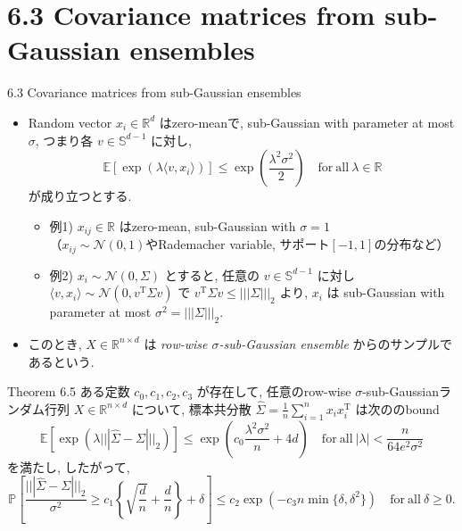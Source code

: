 \documentclass[unicode,aspectratio=169,11pt]{beamer}
\newcommand{\ex}{\mathbb{E}}
\newcommand{\bb}{\mathbb}
\newcommand{\cc}{\mathcal}
\newcommand{\tr}{\mathrm{T}}
\begin{document}
\section{6.3 Covariance matrices from sub-Gaussian ensembles}
\begin{frame}{6.3 Covariance matrices from sub-Gaussian ensembles}{}
  \begin{itemize}
    \item Random vector $x_i \in \bb{R}^d$ はzero-meanで, sub-Gaussian with parameter at most $\sigma$, つまり各 $v \in \bb{S}^{d-1}$ に対し,
          \[
              \ex\left[\exp\left(\lambda \langle v, x_i \rangle\right)\right]
              \le \exp\left(\frac{\lambda^2\sigma^2}{2}\right)
              \quad \mathrm{for\ all}\ \lambda \in \bb{R}
              \tag{6.18}
          \]
          が成り立つとする.
          \begin{itemize}
            \item 例1) $x_{ij} \in \bb{R}$ はzero-mean, sub-Gaussian with $\sigma = 1$\\
                  （$x_{ij} \sim \cc{N}(0,1)$やRademacher variable, サポート$[-1,1]$の分布など）
            \item 例2) $x_i \sim \cc{N}(0, \Sigma)$ とすると,
            任意の $v \in \bb{S}^{d-1}$ に対し $\langle v, x_i \rangle \sim \cc{N}(0, v^\tr \Sigma v)$ で $v^\tr \Sigma v \le |||\Sigma|||_2$ より,
            $x_i$ は sub-Gaussian with parameter at most $\sigma^2 = |||\Sigma|||_2$.
          \end{itemize}
    \item このとき, $X \in \bb{R}^{n \times d}$ は {\it row-wise $\sigma$-sub-Gaussian ensemble} からのサンプルであるという.
  \end{itemize}
\end{frame}

\begin{frame}
  \begin{block}{Theorem 6.5}
    ある定数 $c_0, c_1, c_2 , c_3$ が存在して,
    任意のrow-wise $\sigma$-sub-Gaussianランダム行列 $X \in \bb{R}^{n \times d}$ について,
    標本共分散 $\widehat{\Sigma} = \frac{1}{n}\sum_{i=1}^n x_i x_i^\tr$ は次ののbound
    \[
      \ex\left[ \exp\left( \lambda |||\widehat{\Sigma} - \Sigma|||_2 \right) \right]
      \le \exp\left( c_0\frac{\lambda^2\sigma^2}{n} + 4d \right)
      \quad \mathrm{for\ all}\ |\lambda| < \frac{n}{64e^2\sigma^2}
      \tag{6.19a}
    \]
    を満たし, したがって,
    \[
      \bb{P}\left[ \frac{|||\widehat{\Sigma} - \Sigma|||_2}{\sigma^2} \ge c_1 \left\{ \sqrt{\frac{d}{n}} + \frac{d}{n} \right\} + \delta \right]
      \le c_2 \exp\left(-c_3 n \min\{\delta, \delta^2\}\right)
      \quad \mathrm{for\ all}\ \delta \ge 0.
      \tag{6.19b}
    \]
  \end{block}
\end{frame}
\end{document}
